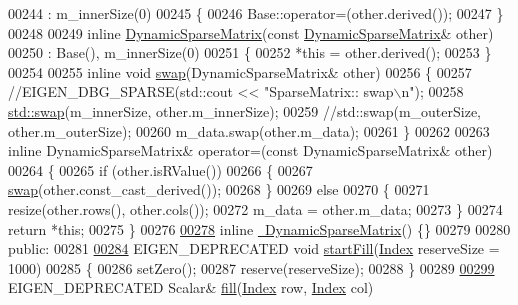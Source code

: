\begin{DoxyCode}
00244       : m\_innerSize(0)
00245     \{
00246     Base::operator=(other.derived());
00247     \}
00248 
00249     \textcolor{keyword}{inline} \hyperlink{class_eigen_1_1_dynamic_sparse_matrix}{DynamicSparseMatrix}(\textcolor{keyword}{const} \hyperlink{class_eigen_1_1_dynamic_sparse_matrix}{DynamicSparseMatrix}& other)
00250       : Base(), m\_innerSize(0)
00251     \{
00252       *\textcolor{keyword}{this} = other.derived();
00253     \}
00254 
00255     \textcolor{keyword}{inline} \textcolor{keywordtype}{void} \hyperlink{endian_8c_a3ca5ecd34b04d6a243c054ac3a57f68d}{swap}(DynamicSparseMatrix& other)
00256     \{
00257       \textcolor{comment}{//EIGEN\_DBG\_SPARSE(std::cout << "SparseMatrix:: swap\(\backslash\)n");}
00258       \hyperlink{endian_8c_a3ca5ecd34b04d6a243c054ac3a57f68d}{std::swap}(m\_innerSize, other.m\_innerSize);
00259       \textcolor{comment}{//std::swap(m\_outerSize, other.m\_outerSize);}
00260       m\_data.swap(other.m\_data);
00261     \}
00262 
00263     \textcolor{keyword}{inline} DynamicSparseMatrix& operator=(\textcolor{keyword}{const} DynamicSparseMatrix& other)
00264     \{
00265       \textcolor{keywordflow}{if} (other.isRValue())
00266       \{
00267         \hyperlink{endian_8c_a3ca5ecd34b04d6a243c054ac3a57f68d}{swap}(other.const\_cast\_derived());
00268       \}
00269       \textcolor{keywordflow}{else}
00270       \{
00271         resize(other.rows(), other.cols());
00272         m\_data = other.m\_data;
00273       \}
00274       \textcolor{keywordflow}{return} *\textcolor{keyword}{this};
00275     \}
00276 
\hyperlink{class_eigen_1_1_dynamic_sparse_matrix_af0677c8aec1e1dee9f0a389509082a83}{00278}     \textcolor{keyword}{inline} \hyperlink{class_eigen_1_1_dynamic_sparse_matrix_af0677c8aec1e1dee9f0a389509082a83}{~DynamicSparseMatrix}() \{\}
00279 
00280   \textcolor{keyword}{public}:
00281 
\hyperlink{class_eigen_1_1_dynamic_sparse_matrix_abade0bf46139d8577aa24ead30c76771}{00284}     EIGEN\_DEPRECATED \textcolor{keywordtype}{void} \hyperlink{class_eigen_1_1_dynamic_sparse_matrix_abade0bf46139d8577aa24ead30c76771}{startFill}(\hyperlink{group___core___module_a554f30542cc2316add4b1ea0a492ff02}{Index} reserveSize = 1000)
00285     \{
00286       setZero();
00287       reserve(reserveSize);
00288     \}
00289 
\hyperlink{class_eigen_1_1_dynamic_sparse_matrix_a70c8f529b38fd5b7d93d6dfe1a122723}{00299}     EIGEN\_DEPRECATED Scalar& \hyperlink{class_eigen_1_1_dynamic_sparse_matrix_a70c8f529b38fd5b7d93d6dfe1a122723}{fill}(\hyperlink{group___core___module_a554f30542cc2316add4b1ea0a492ff02}{Index} row, \hyperlink{group___core___module_a554f30542cc2316add4b1ea0a492ff02}{Index} col)

\end{DoxyCode}
